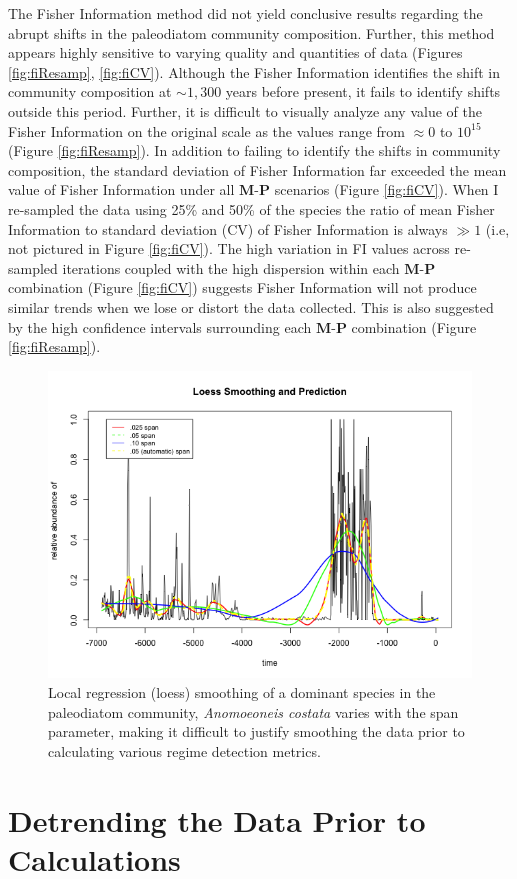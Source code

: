 \documentclass[print]{nuthesis}
\begin{document}
The Fisher Information method did not yield conclusive results regarding the abrupt shifts in the paleodiatom community composition. Further, this method appears highly sensitive to varying quality and quantities of data (Figures \ref{fig:fiResamp}, \ref{fig:fiCV}). Although the Fisher Information identifies the shift in community composition at \(\sim1,300\) years before present, it fails to identify shifts outside this period. Further, it is difficult to visually analyze any value of the Fisher Information on the original scale as the values range from \(\approx 0\) to \(10^{15}\) (Figure \ref{fig:fiResamp}). In addition to failing to identify the shifts in community composition, the standard deviation of Fisher Information far exceeded the mean value of Fisher Information under all \(\textbf{M}\)-\(\textbf{P}\) scenarios (Figure \ref{fig:fiCV}). When I re-sampled the data using 25\% and 50\% of the species the ratio of mean Fisher Information to standard deviation (CV) of Fisher Information is always \(\gg 1\) (i.e, not pictured in Figure \ref{fig:fiCV}). The high variation in FI values across re-sampled iterations coupled with the high dispersion within each \(\textbf{M}\)-\(\textbf{P}\) combination (Figure \ref{fig:fiCV}) suggests Fisher Information will not produce similar trends when we lose or distort the data collected. This is also suggested by the high confidence intervals surrounding each \(\textbf{M}\)-\(\textbf{P}\) combination (Figure \ref{fig:fiResamp}).


\begin{figure}
\includegraphics[width=0.85\linewidth]{./chapterFiles/resampling/figsCalledInDiss/loess} \caption{Local regression (loess) smoothing of a dominant species in the paleodiatom community, \emph{Anomoeoneis costata} varies with the span parameter, making it difficult to justify smoothing the data prior to calculating various regime detection metrics.}\label{fig:loessEx}
\end{figure}
\hypertarget{detrending-the-data-prior-to-calculations}{%
\section{Detrending the Data Prior to Calculations}\label{detrending-the-data-prior-to-calculations}}
\end{document}
